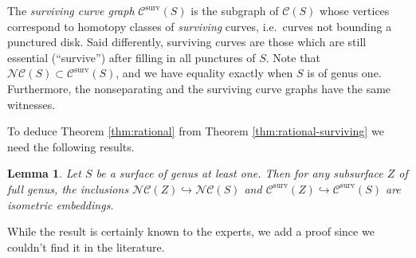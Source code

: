 \documentclass{amsart}
\newcommand{\C}{\mathcal{C}}
\newcommand{\NC}{\mathcal{NC}}
\newcommand{\Csurv}{\C^{\text{surv}}}
\newtheorem{lemma}[thm]{Lemma}
\theoremstyle{definition}
\begin{document}
The \emph{surviving curve graph} \(\Csurv(S)\) is the subgraph of \(\C(S)\) whose vertices correspond to homotopy classes of \emph{surviving} curves, i.e.\ curves not bounding a punctured disk. Said differently, surviving curves are those which are still essential (``survive'') after filling in all punctures of \(S\). Note that \(\NC(S)\subset \Csurv(S)\), and we have equality exactly when \(S\) is of genus one. Furthermore, the nonseparating and the surviving curve graphs have the same witnesses.

To deduce Theorem \ref{thm:rational} from Theorem \ref{thm:rational-surviving} we need the following results.

\begin{lemma}\label{lem:isometric-embeddings}
Let \(S\) be a surface of genus at least one. Then for any subsurface \(Z\) of full genus, the inclusions \(\NC(Z)\hookrightarrow\NC(S)\) and \(\Csurv(Z)\hookrightarrow\Csurv(S)\) are isometric embeddings.
\end{lemma}

While the result is certainly known to the experts, we add a proof since we couldn't find it in the literature.
\end{document}
